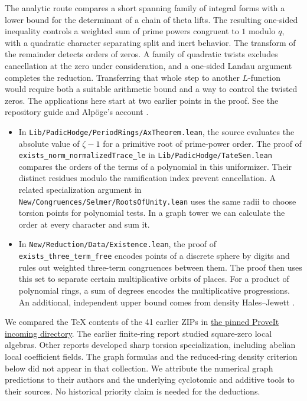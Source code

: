 \documentclass[10pt,letterpaper]{article}
\theoremstyle{remark}\newtheorem{remark}[theorem]{Remark}
\begin{document}
The analytic route compares a short spanning family of integral forms with
a lower bound for the determinant of a chain of theta lifts. The resulting
one-sided inequality controls a weighted sum of prime powers congruent to
$1$ modulo $q$, with a quadratic character separating split and inert
behavior. The transform of the remainder detects orders of zeros. A family
of quadratic twists excludes cancellation at the zero under consideration,
and a one-sided Landau argument completes the reduction. Transferring that
whole step to another $L$-function would require both a suitable
arithmetic bound and a way to control the twisted zeros. The applications
here start at two earlier points in the proof. See the repository guide and
Alpöge's account \cite{LeanRepo,Alpoge}.

\begin{itemize}[nosep,leftmargin=1.5em]
\item In \texttt{Lib/PadicHodge/PeriodRings/AxTheorem.lean}, the source
evaluates the absolute value of $\zeta-1$ for a primitive root of
prime-power order. The proof of \texttt{exists\_norm\_normalizedTrace\_le}
in \texttt{Lib/PadicHodge/TateSen.lean} compares the orders of the terms
of a polynomial in this uniformizer. Their distinct residues modulo the
ramification index prevent cancellation. A related specialization
argument in \texttt{New/Congruences/Selmer/RootsOfUnity.lean} uses the
same radii to choose torsion points for polynomial tests. In a graph
tower we can calculate the order at every character and sum it.
\item In \texttt{New/Reduction/Data/Existence.lean}, the proof of
\texttt{exists\_three\_term\_free} encodes points of a discrete sphere
by digits and rules out weighted three-term congruences between them.
The proof then uses this set to separate certain multiplicative orbits of
places. For a product of polynomial rings, a sum of degrees encodes the
multiplicative progressions. An additional, independent upper bound comes
from density Hales--Jewett \cite{DHJ}.
\end{itemize}

We compared the TeX contents of the 41 earlier ZIPs in
\href{https://github.com/VladimirReshetnikov/ProveIt/tree/5ed40f562710fcc2770bbb463dba528a6727f7ae/docs/incoming}{the pinned ProveIt incoming directory}.
The earlier finite-ring report studied square-zero local algebras. Other
reports developed sharp torsion specialization, including abelian local
coefficient fields. The graph formulas and the reduced-ring density
criterion below did not appear in that collection. We attribute the
numerical graph predictions to their authors and the underlying
cyclotomic and additive tools to their sources. No historical priority
claim is needed for the deductions.






\end{document}
